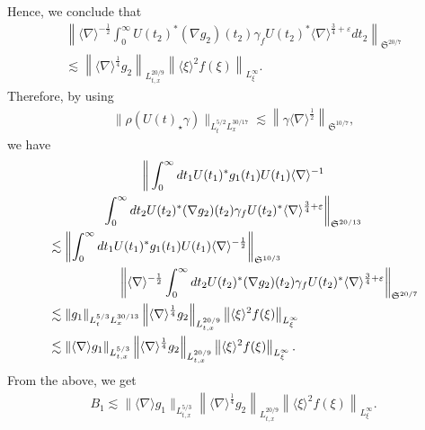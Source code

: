 \documentclass[10pt,a4paper]{amsart}
\providecommand{\No}[1]{\left\| #1 \right\|}
\newcommand{\FS}{\mathfrak{S}}
\newcommand{\ga}{\gamma}
\newcommand{\ep}{\varepsilon}
\newcommand{\rh}{\rho}
\renewcommand{\No}[1]{\left\| #1 \right\|}
\newcommand{\I}{\infty}
\newcommand{\sd}{\langle \nabla \rangle}
\newcommand{\sdi}{\sd^{-1}}
\newcommand{\lxr}{\langle \xi \rangle}
\newcommand{\tx}{{t,x}}
\newcommand{\st}{\star}
\newcommand{\ft}{{\frac{1}{4}}}
\newcommand{\fh}{\frac{3}{4}}
\newcommand{\tw}{\frac{1}{2}}
\newcommand{\na}{\nabla}
\newcommand{\ls}{\lesssim}
\begin{document}
Hence, we conclude that
\begin{multline}
\No{\sd^{-\tw}\int_0^\I U(t_2)^* (\na g_2)(t_2)\ga_f U(t_2)^* \sd^{\fh+\ep} dt_2 }_{\FS^{20/7}}\\
\ls \left\|\sd^{\ft} g_2\right\|_{L^{20/9}_\tx} \left\|\lxr^2 f(\xi)\right\|_{L^\I_\xi}.
\end{multline}
Therefore, by using
\begin{align}
\|\rh(U(t)_\st \ga)\|_{L^{5/2}_t L^{30/17}_x} \ls \left\|\ga \sd^\tw\right\|_{\FS^{10/7}},
\end{align}
we have
\begin{multline}
\bigg\|\int_0^\I dt_1 U(t_1)^* g_1(t_1) U(t_1) \sdi
\\
\int_0^\I dt_2 U(t_2)^* (\na g_2)(t_2)\ga_f U(t_2)^* \sd^{\fh+\ep} \bigg\|_{\FS^{20/13}} \\
\begin{aligned}
&\ls \No{\int_0^\I dt_1 U(t_1)^* g_1(t_1) U(t_1) \sd^{-\tw}}_{\FS^{10/3}}\\
&\mkern100mu\No{\sd^{-\tw}\int_0^\I dt_2 U(t_2)^* (\na g_2)(t_2) \ga_f U(t_2)^* \sd^{\fh+\ep} }_{\FS^{20/7}} \\
&\ls \|g_1\|_{L^{5/3}_t L^{30/13}_x} \left\|\sd^{\ft} g_2\right\|_{L^{20/9}_\tx} \left\|\lxr^2 f(\xi)\right\|_{L^\I_\xi} \\
&\ls \|\sd g_1\|_{L^{5/3}_\tx} \left\|\sd^{\ft} g_2\right\|_{L^{20/9}_\tx} \left\|\lxr^2 f(\xi)\right\|_{L^\I_\xi}.
\end{aligned}
\end{multline}
From the above, we get
\begin{align}
B_1 \ls \|\sd g_1\|_{L^{5/3}_\tx} \left\|\sd^{\ft} g_2\right\|_{L^{20/9}_\tx} \left\|\lxr^2 f(\xi)\right\|_{L^\I_\xi}.
\end{align}
\end{document}
